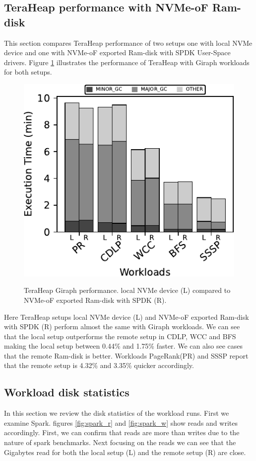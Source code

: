 \subsection{TeraHeap performance with NVMe-oF Ram-disk}
\par This section compares TeraHeap performance of two setups one with local NVMe device and one with NVMe-oF exported Ram-disk with SPDK User-Space drivers. Figure \ref{fig:ram_giraph} illustrates the performance of TeraHeap with Giraph workloads for both setups.
\begin{figure}[H]
  \includegraphics[width=\linewidth]{figures/ram_giraph.pdf}\\
\caption{TeraHeap Giraph performance. local NVMe device (L) compared to NVMe-oF exported Ram-disk with SPDK (R).}
\label{fig:ram_giraph}
\end{figure}
Here TeraHeap setups local NVMe device (L) and NVMe-oF exported Ram-disk with
SPDK (R) perform almost the same with Giraph workloads. We can see that the local setup
outperforms the remote setup in CDLP, WCC and BFS making the local setup between 0.44\% and 1.75\% faster. We can also see cases that the remote Ram-disk is better. Workloads PageRank(PR) and SSSP report that the remote
setup is 4.32\% and 3.35\% quicker accordingly.

\subsection{Workload disk statistics}
 In this section we review the disk statistics of the workload runs. First we
 examine Spark. figures \ref{fig:spark_r} and \ref{fig:spark_w} show reads and
 writes accordingly. First, we can confirm that reads are more than writes due to
 the nature of spark benchmarks. Next focusing on the reads we can see that the
 Gigabytes read for both the local setup (L) and the remote setup (R) are close.
 

